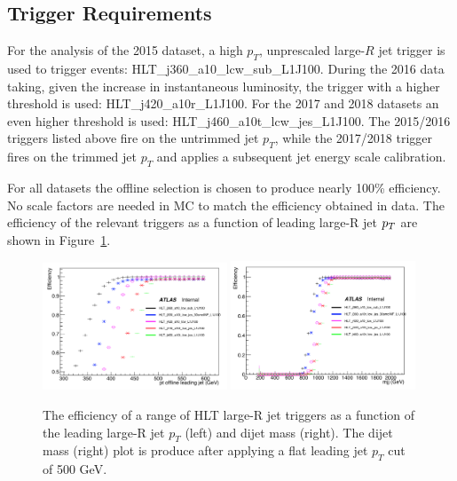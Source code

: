 \subsection{Trigger Requirements}
\label{subsec:trig}

For the analysis of the 2015 dataset, a high $p_T$, unprescaled large-$R$ jet trigger is used to trigger events: HLT\_j360\_a10\_lcw\_sub\_L1J100. During the 2016 data taking, given the increase in instantaneous luminosity, the trigger with a higher threshold is used: HLT\_j420\_a10r\_L1J100. For the 2017 and 2018 datasets an even higher threshold is used: HLT\_j460\_a10t\_lcw\_jes\_L1J100. The 2015/2016 triggers listed above fire on the untrimmed jet $p_T$, while the 2017/2018 trigger fires on the trimmed jet $p_T$ and applies a subsequent jet energy scale calibration.

For all datasets the offline selection is chosen to produce nearly 100\% efficiency. No scale factors are needed in MC to match the efficiency obtained in data.
The efficiency of the relevant triggers as a function of leading large-R jet $p_{T}$ are shown in Figure~\ref{fig:trigeffturnon}.

\begin{figure}[htbp!]
\begin{center}
\includegraphics[width=0.49\textwidth]{trigger_eff_vs_pt.png}
\includegraphics[width=0.49\textwidth]{trigger_eff_vs_mjj.png}
\end{center}
\caption{
    The efficiency of a range of HLT large-R jet triggers as a function of the leading large-R jet $p_T$ (left) and dijet mass (right).
    The dijet mass (right) plot is produce after applying a flat leading jet $p_T$ cut of 500 GeV.
}
\label{fig:trigeffturnon}
\end{figure}

